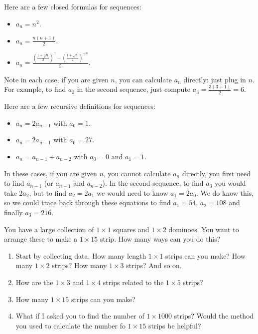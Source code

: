 \documentclass[11pt,]{book}
\theoremstyle{ptxplainnotitle}
\theoremstyle{ptxplaintitle}
\theoremstyle{ptxdefinitionnotitle}
\theoremstyle{ptxdefinitiontitle}
\theoremstyle{ptxdefinitionnotitle}
\theoremstyle{ptxdefinitiontitle}
\theoremstyle{ptxdefinitionnotitle}
\theoremstyle{ptxdefinitiontitle}
\theoremstyle{ptxdefinitiontitlenonumber}
\theoremstyle{ptxdefinitiontitlenonumber}
\numberwithin{equation}{chapter}
\renewcommand{\d}{\displaystyle}
\begin{document}
\begin{example}\label{example-2}
\hypertarget{p-43}{}%
Here are a few closed formulas for sequences: \leavevmode%
\begin{itemize}[label=\textbullet]
\item{}\(a_n = n^2\).%
\item{}\(\d a_n = \frac{n(n+1)}{2}\).%
\item{}\(\d a_n = \frac{\left(\frac{1 + \sqrt 5}{2}\right)^n - \left(\frac{1 + \sqrt 5}{2}\right)^{-n}}{5}\).%
\end{itemize}
%
\par
\hypertarget{p-44}{}%
Note in each case, if you are given \(n\), you can calculate \(a_n\) directly: just plug in \(n\).  For example, to find \(a_3\) in the second sequence, just compute \(a_3 = \frac{3(3+1)}{2} = 6\).%
\par
\hypertarget{p-45}{}%
Here are a few recursive definitions for sequences: \leavevmode%
\begin{itemize}[label=\textbullet]
\item{}\(a_n = 2a_{n-1}\) with \(a_0 = 1\).%
\item{}\(a_n = 2a_{n-1}\) with \(a_0 = 27\).%
\item{}\(a_n = a_{n-1} + a_{n-2}\) with \(a_0 = 0\) and \(a_1 = 1\).%
\end{itemize}
%
\par
\hypertarget{p-46}{}%
In these cases, if you are given \(n\), you cannot calculate \(a_n\) directly, you first need to find \(a_{n-1}\) (or \(a_{n-1}\) and \(a_{n-2}\)). In the second sequence, to find \(a_3\) you would take \(2a_2\), but to find \(a_2 = 2a_1\) we would need to know \(a_1 = 2a_0\).  We do know this, so we could trace back through these equations to find \(a_1 = 54\), \(a_2 = 108\) and finally \(a_3 = 216\).%
\end{example}
\begin{investigation}\label{investigation-3}
\hypertarget{p-47}{}%
You have a large collection of \(1\times 1\) squares and \(1\times 2\) dominoes. You want to arrange these to make a \(1 \times 15\) strip. How many ways can you do this? %
\begin{enumerate}
\item\hypertarget{li-30}{}\hypertarget{p-48}{}%
Start by collecting data. How many length \(1\times 1\) strips can you make? How many \(1\times 2\) strips? How many \(1\times 3\) strips? And so on.%
\item\hypertarget{li-31}{}\hypertarget{p-49}{}%
How are the \(1\times 3\) and \(1 \times 4\) strips related to the \(1\times 5\) strips?%
\item\hypertarget{li-32}{}\hypertarget{p-50}{}%
How many \(1\times 15\) strips can you make?%
\item\hypertarget{li-33}{}\hypertarget{p-51}{}%
What if I asked you to find the number of \(1\times 1000\) strips? Would the method you used to calculate the number fo \(1 \times 15\) strips be helpful?%
\end{enumerate}
%
\end{investigation}
\end{document}
